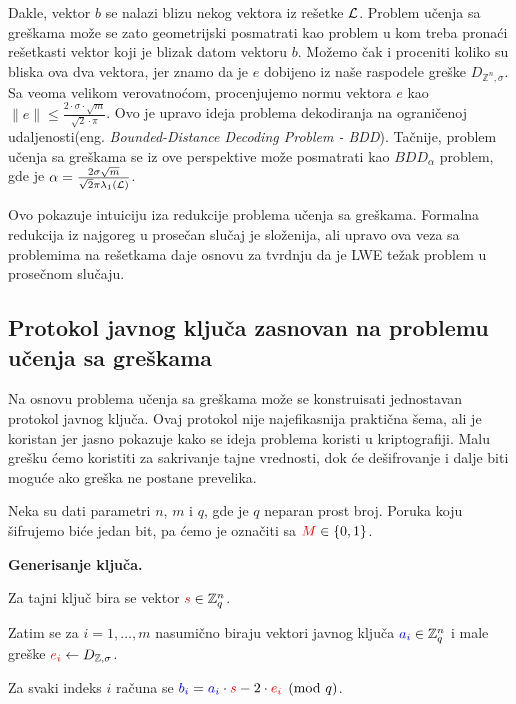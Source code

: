 Dakle, vektor $b$ se nalazi blizu nekog vektora iz rešetke $\mathcal{L}$.
Problem učenja sa greškama može se zato geometrijski posmatrati kao problem u kom treba pronaći
rešetkasti vektor koji je blizak datom vektoru $b$.
Možemo čak i proceniti koliko su bliska ova dva vektora,
jer znamo da je $e$ dobijeno iz naše raspodele greške $D_{\mathbb{Z}^n,\sigma}$.
Sa veoma velikom verovatnoćom, procenjujemo normu vektora $e$ kao $ \|e\| \leq \frac{2 \cdot \sigma \cdot \sqrt{m}}{\sqrt{2} \cdot \pi} $. 
Ovo je upravo ideja problema dekodiranja na ograničenoj udaljenosti(eng. \textit{Bounded-Distance Decoding Problem - BDD}). 
Tačnije, problem učenja sa greškama se iz ove perspektive može posmatrati kao $BDD_\alpha$ problem, gde je
$ \alpha = \frac{2\sigma\sqrt{m}}{\sqrt{2}\pi \lambda_1(\mathcal{L})} $.

Ovo pokazuje intuiciju iza redukcije problema učenja sa greškama.
Formalna redukcija iz najgoreg u prosečan slučaj je složenija\cite{regev2005lwe},
ali upravo ova veza sa problemima na rešetkama daje osnovu za tvrdnju da je LWE težak problem u prosečnom slučaju.

\subsection{Protokol javnog ključa zasnovan na problemu učenja sa greškama}

Na osnovu problema učenja sa greškama može se konstruisati jednostavan protokol javnog ključa.
Ovaj protokol nije najefikasnija praktična šema,
ali je koristan jer jasno pokazuje kako se ideja problema koristi u kriptografiji.
Malu grešku ćemo koristiti za sakrivanje tajne vrednosti,
dok će dešifrovanje i dalje biti moguće ako greška ne postane prevelika.

Neka su dati parametri $n$, $m$ i $q$, gde je $q$ neparan prost broj.
Poruka koju šifrujemo biće jedan bit, pa ćemo je označiti sa $\textcolor{red}{M} \in \{0,1\}$.

\noindent\textbf{Generisanje ključa.}

Za tajni ključ bira se vektor $ \textcolor{red}{s} \in \mathbb{Z}_q^n $.

Zatim se za $i = 1,\ldots,m$ nasumično biraju vektori javnog ključa $ \textcolor{blue}{a_i} \in \mathbb{Z}_q^n $
i male greške $ \textcolor{red}{e_i} \leftarrow D_{\mathbb{Z},\sigma} $. 

Za svaki indeks $i$ računa se $ \textcolor{blue}{b_i} = \textcolor{blue}{a_i} \cdot \textcolor{red}{s} - 2\cdot\textcolor{red}{e_i} \pmod q $.

